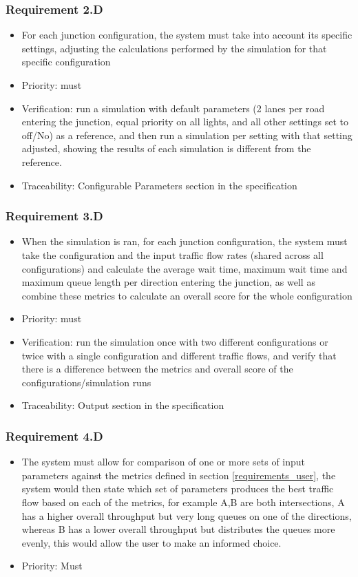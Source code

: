 \documentclass{article}
\begin{document}
\subsubsection{Requirement 2.D}
\begin{itemize}
  \item For each junction configuration, the system must take into account 
  its specific settings, adjusting the calculations performed by the simulation 
  for that specific configuration
  \item Priority: must
  \item Verification: run a simulation with default parameters (2 lanes per 
  road entering the junction, equal priority on all lights, and all other 
  settings set to off/No) as a reference, and then run a simulation per setting 
  with that setting adjusted, showing the results of each simulation is different 
  from the reference.
  \item Traceability: Configurable Parameters section in the specification
\end{itemize}

\subsubsection{Requirement 3.D}
\begin{itemize}
  \item When the simulation is ran, for each junction configuration, the system 
  must take the configuration and the input traffic flow rates (shared across all 
  configurations) and calculate the average wait time, maximum wait time and 
  maximum queue length per direction entering the junction, as well as combine 
  these metrics to calculate an overall score for the whole configuration
  \item Priority: must
  \item Verification: run the simulation once with two different configurations 
  or twice with a single configuration and different traffic flows, and verify 
  that there is a difference between the metrics and overall score of the 
  configurations/simulation runs
  \item Traceability: Output section in the specification
\end{itemize}

\subsubsection{Requirement 4.D}
\begin{itemize}
  \item The system must allow for comparison of one or more sets of input 
  parameters against the metrics defined in section \ref{requirements_user}, 
  the system would then state which set of parameters produces the best traffic 
  flow based on each of the metrics, for example A,B are both intersections, 
  A has a higher overall throughput but very long queues on one of the directions, 
  whereas B has a lower overall throughput but distributes the queues more evenly, 
  this would allow the user to make an informed choice.
  \item Priority: Must 
\end{itemize}
\end{document}
